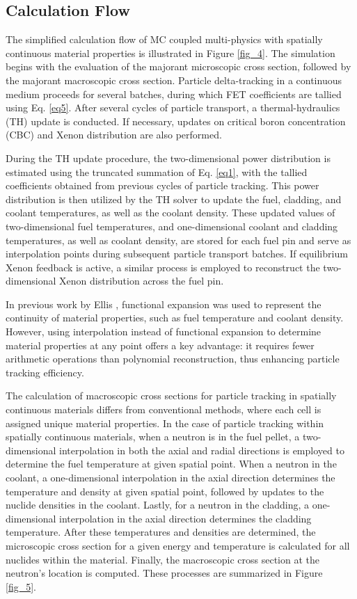 \subsection{Calculation Flow} \label{sec25}

The simplified calculation flow of MC coupled multi-physics with spatially continuous material properties is illustrated in Figure \ref{fig_4}. The simulation begins with the evaluation of the majorant microscopic cross section, followed by the majorant macroscopic cross section. Particle delta-tracking in a continuous medium proceeds for several batches, during which FET coefficients are tallied using Eq. \ref{eq5}. After several cycles of particle transport, a thermal-hydraulics (TH) update is conducted. If necessary, updates on critical boron concentration (CBC) and Xenon distribution are also performed.

During the TH update procedure, the two-dimensional power distribution is estimated using the truncated summation of Eq. \ref{eq1}, with the tallied coefficients obtained from previous cycles of particle tracking. This power distribution is then utilized by the TH solver to update the fuel, cladding, and coolant temperatures, as well as the coolant density. These updated values of two-dimensional fuel temperatures, and one-dimensional coolant and cladding temperatures, as well as coolant density, are stored for each fuel pin and serve as interpolation points during subsequent particle transport batches. If equilibrium Xenon feedback is active, a similar process is employed to reconstruct the two-dimensional Xenon distribution across the fuel pin.

In previous work by Ellis \cite{ellis, ellis_2016}, functional expansion was used to represent the continuity of material properties, such as fuel temperature and coolant density. However, using interpolation instead of functional expansion to determine material properties at any point offers a key advantage: it requires fewer arithmetic operations than polynomial reconstruction, thus enhancing particle tracking efficiency.

The calculation of macroscopic cross sections for particle tracking in spatially continuous materials differs from conventional methods, where each cell is assigned unique material properties. In the case of particle tracking within spatially continuous materials, when a neutron is in the fuel pellet, a two-dimensional interpolation in both the axial and radial directions is employed to determine the fuel temperature at given spatial point. When a neutron in the coolant, a one-dimensional interpolation in the axial direction determines the temperature and density at given spatial point, followed by updates to the nuclide densities in the coolant. Lastly, for a neutron in the cladding, a one-dimensional interpolation in the axial direction determines the cladding temperature. After these temperatures and densities are determined, the microscopic cross section for a given energy and temperature is calculated for all nuclides within the material. Finally, the macroscopic cross section at the neutron's location is computed. These processes are summarized in Figure \ref{fig_5}.


